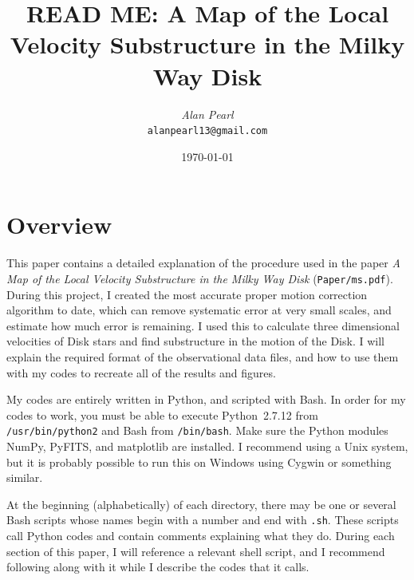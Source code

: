 \documentclass{article}
\begin{document}
\title{\textbf{READ ME:} A Map of the Local Velocity Substructure in the Milky Way Disk}
\author{\textit{Alan Pearl}\\
  \texttt{alanpearl13@gmail.com}}
 \date{\today}
\maketitle

\section{Overview}

This paper contains a detailed explanation of the procedure used in the paper \textit{A Map of the Local Velocity Substructure in the Milky Way Disk} (\texttt{Paper/ms.pdf}). During this project, I created the most accurate proper motion correction algorithm to date, which can remove systematic error at very small scales, and estimate how much error is remaining. I used this to calculate three dimensional velocities of Disk stars and find substructure in the motion of the Disk. I will explain the required format of the observational data files, and how to use them with my codes to recreate all of the results and figures. 

My codes are entirely written in Python, and scripted with Bash. In order for my codes to work, you must be able to execute Python~2.7.12 from \texttt{/usr/bin/python2} and Bash from \texttt{/bin/bash}. Make sure the Python modules NumPy, PyFITS, and matplotlib are installed. I recommend using a Unix system, but it is probably possible to run this on Windows using Cygwin or something similar.

At the beginning (alphabetically) of each directory, there may be one or several Bash scripts whose names begin with a number and end with \texttt{.sh}. These scripts call Python codes and contain comments explaining what they do. During each section of this paper, I will reference a relevant shell script, and I recommend following along with it while I describe the codes that it calls.
\end{document}
